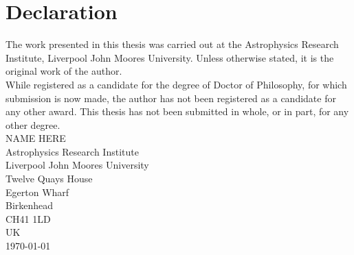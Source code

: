 \chapter*{Declaration}
The work presented in this thesis was carried out at the Astrophysics Research Institute,
Liverpool John Moores University. Unless otherwise stated, it is the original work
of the author.\\
While registered as a candidate for the degree of Doctor of Philosophy, for which submission 
is now made, the author has not been registered as a candidate for any other award. This thesis
has not been submitted in whole, or in part, 
for any other degree.\\


\vfill
NAME HERE\\
Astrophysics Research Institute\\
Liverpool John Moores University\\
Twelve Quays House\\
Egerton Wharf\\
Birkenhead\\
CH41 1LD\\
UK\\
\vfill
{\sc \hfill\today}


